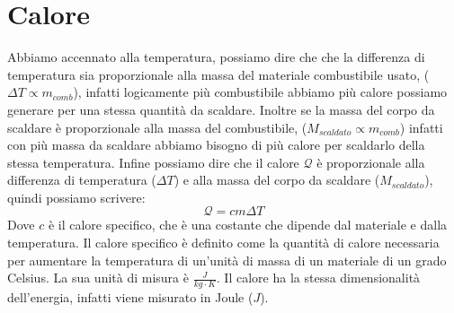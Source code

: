 \section{Calore}
    Abbiamo accennato alla temperatura, possiamo dire che che la differenza di temperatura sia proporzionale alla massa del materiale combustibile usato, ($\Delta T \propto m_{comb}$), infatti logicamente più combustibile abbiamo più calore possiamo generare per una stessa quantità da scaldare. Inoltre se la massa del corpo da scaldare è proporzionale alla massa del combustibile, ($M_{scaldato} \propto m_{comb}$) infatti con più massa da scaldare abbiamo bisogno di più calore per scaldarlo della stessa temperatura. Infine possiamo dire che il calore $\mathcal{Q}$ è proporzionale alla differenza di temperatura ($\Delta T$) e alla massa del corpo da scaldare ($M_{scaldato}$), quindi possiamo scrivere:
    $$
        \mathcal{Q}=cm\Delta T
    $$
    Dove $c$ è il calore specifico, che è una costante che dipende dal materiale e dalla temperatura. Il calore specifico è definito come la quantità di calore necessaria per aumentare la temperatura di un'unità di massa di un materiale di un grado Celsius. La sua unità di misura è $\frac{J}{kg\cdot K}$. Il calore ha la stessa dimensionalità dell'energia, infatti viene misurato in Joule ($J$). 
